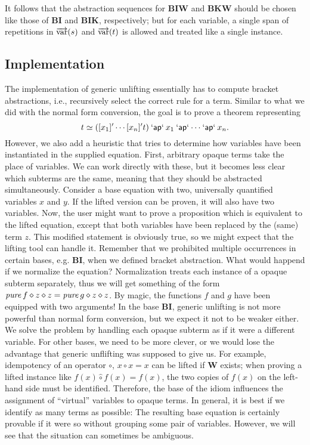 It follows that the abstraction sequences for $\mathbf{BIW}$ and $\mathbf{BKW}$
should be chosen like those of $\mathbf{BI}$ and $\mathbf{BIK}$, respectively;
but for each variable, a single span of repetitions in $\overrightarrow{\operatorname{var}}(s)$ and
$\overrightarrow{\operatorname{var}}(t)$ is allowed and treated like a single instance.

\subsection{Implementation}\label{subsec:combinator-implementation}

The implementation of generic unlifting essentially has to compute bracket
abstractions, i.e., recursively select the correct rule for a term.
Similar to what we did with the normal form conversion, the goal is to prove a
theorem representing
\[ t \simeq ([x_1]'\cdots[x_n]'t) \mathbin{\mathsf{`ap`}} x_1 \mathbin{\mathsf{`ap`}} \cdots \mathbin{\mathsf{`ap`}} x_n. \]
However, we also add a heuristic that tries to determine how variables have
been instantiated in the supplied equation.
First, arbitrary opaque terms take the place of variables.
We can work directly with these, but it becomes less clear which subterms are
the same, meaning that they should be abstracted simultaneously.
Consider a base equation with two, universally quantified variables $x$ and $y$.
If the lifted version can be proven, it will also have two variables.
Now, the user might want to prove a proposition which is equivalent to the
lifted equation, except that both variables have been replaced by the
(same) term $z$.
This modified statement is obviously true, so we might expect that the lifting
tool can handle it.
Remember that we prohibited multiple occurrences in certain bases, e.g.
$\mathbf{BI}$, when we defined bracket abstraction.
What would happend if we normalize the equation?
Normalization treats each instance of a opaque subterm separately, thus we will
get something of the form $\operatorname{\mathit{pure}} f \diamond z \diamond z = \operatorname{\mathit{pure}} g \diamond z \diamond z$.
By magic, the functions $f$ and $g$ have been equipped with two arguments!
In the base $\mathbf{BI}$, generic unlifting is not more powerful than
normal form conversion, but we expect it not to be weaker either.
We solve the problem by handling each opaque subterm as if it were a different
variable.
For other bases, we need to be more clever, or we would lose the advantage
that generic unflifting was supposed to give us.
For example, idempotency of an operator $\circ$, $x \circ x = x$
can be lifted if $\mathbf{W}$ exists;
when proving a lifted instance like $f(x) \hat\circ f(x) = f(x)$, the two
copies of $f(x)$ on the left-hand side must be identified.
Therefore, the base of the idiom influences the assignment of ``virtual''
variables to opaque terms.
In general, it is best if we identify as many terms as possible:
The resulting base equation is certainly provable if it were so without grouping
some pair of variables.
However, we will see that the situation can sometimes be ambiguous.

